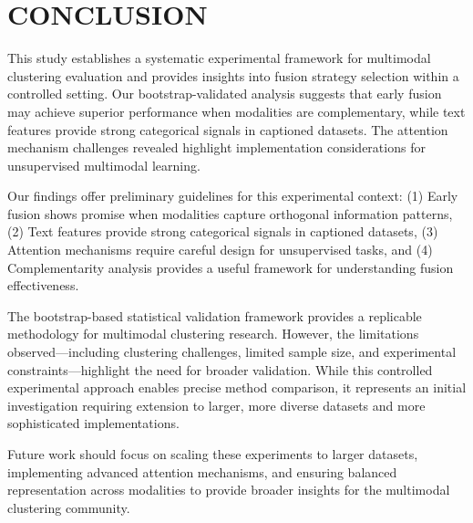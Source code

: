 \documentclass[sigconf]{acmart}
\begin{document}
\section{CONCLUSION}

This study establishes a systematic experimental framework for multimodal clustering evaluation and provides insights into fusion strategy selection within a controlled setting. Our bootstrap-validated analysis suggests that early fusion may achieve superior performance when modalities are complementary, while text features provide strong categorical signals in captioned datasets. The attention mechanism challenges revealed highlight implementation considerations for unsupervised multimodal learning.

Our findings offer preliminary guidelines for this experimental context: (1) Early fusion shows promise when modalities capture orthogonal information patterns, (2) Text features provide strong categorical signals in captioned datasets, (3) Attention mechanisms require careful design for unsupervised tasks, and (4) Complementarity analysis provides a useful framework for understanding fusion effectiveness.

The bootstrap-based statistical validation framework provides a replicable methodology for multimodal clustering research. However, the limitations observed—including clustering challenges, limited sample size, and experimental constraints—highlight the need for broader validation. While this controlled experimental approach enables precise method comparison, it represents an initial investigation requiring extension to larger, more diverse datasets and more sophisticated implementations.

Future work should focus on scaling these experiments to larger datasets, implementing advanced attention mechanisms, and ensuring balanced representation across modalities to provide broader insights for the multimodal clustering community.



\end{document}
